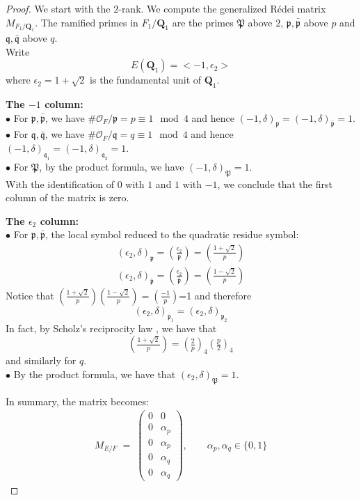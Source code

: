 \documentclass{article}
\numberwithin{equation}{section}
\theoremstyle{plain}  %
\theoremstyle{definition}
\newcommand{\ot}{\mathcal{O}}
\newcommand{\kron}[2]{\left( \tfrac{#1}{#2} \right)}
\newcommand{\Redei}{R\'edei }
\newcommand{\fk}{\mathfrak }
\begin{document}
\begin{proof}
    We start with the $2$-rank. We compute the generalized \Redei matrix $M_{F_1/\mathbf Q_1}$. The ramified primes in $F_1/\mathbf Q_1$ are the primes $\fk P$ above $2$, $\fk p, \bar{\fk p}$ above $p$ and $\fk q, \bar{\fk q}$ above $q$. 
\\ Write $$E(\mathbf Q_1)=<-1,\epsilon_2>$$ where $\epsilon_2=1+\sqrt{2}$ is the fundamental unit of $\mathbf Q_1$. 

\textbf{The $-1$ column:}
\\ $\bullet $ For $\fk p, \bar{\fk p}$, we have $\# \ot_F/\fk p = p \equiv 1 \mod 4$ and hence $(-1,\delta)_{\fk p}=(-1,\delta)_{\bar{\fk p}}=1$.
\\ $\bullet$ For $\fk q, \bar{\fk q}$, we have $\# \ot_F/\fk q = q \equiv 1 \mod 4$ and hence $(-1,\delta)_{\fk q_1}=(-1,\delta)_{\fk q_2}=1$.
\\ $\bullet$ For $\fk P$, by the product formula, we have $(-1,\delta)_{\fk P}=1$.
\\ With the identification of $0$ with $1$ and $1$ with $-1$, we conclude that the first column of the matrix is zero.

\textbf{The $\epsilon_2$ column:}\\
$\bullet $ For $\fk p, \bar{\fk p}$, the local symbol reduced to the quadratic residue symbol: 
\begin{align}
(\epsilon_2,\delta)_{\fk p} = \kron{\epsilon_2}{\fk p} = \kron{1 +\sqrt{2}}{p} \\
(\epsilon_2,\delta)_{\bar{\fk p}} = \kron{\epsilon_2}{\bar{\fk p}} = \kron{1- \sqrt{2}}{p}
\end{align}
Notice that $\kron{1 +\sqrt{2}}{p} \kron{1- \sqrt{2}}{p} = \kron{-1}{p}$=1 and therefore $$(\epsilon_2,\delta)_{\fk p_1} = (\epsilon_2,\delta)_{\fk p_2}$$
In fact, by Scholz's reciprocity law \cite[Prop~5.8, page~160]{MR1761696}, we have that $$\kron{1 +\sqrt{2}}{p} = \kron{2}{p}_4 \kron{p}{2}_4$$ and similarly for $q$. 
\\ $\bullet$ By the product formula, we have that $(\epsilon_2,\delta)_{\fk P}=1$.

In summary, the matrix becomes: 
$$\begin{array}{c} M_{E/F}\;=\;
\begin{pmatrix}
0 & 0\\
0 & \alpha_p\\
0 & \alpha_p\\
0 & \alpha_q\\
0 & \alpha_q
\end{pmatrix},
\qquad \alpha_p,\alpha_q\in\{0,1\} \end{array}$$


\end{proof}
\end{document}
